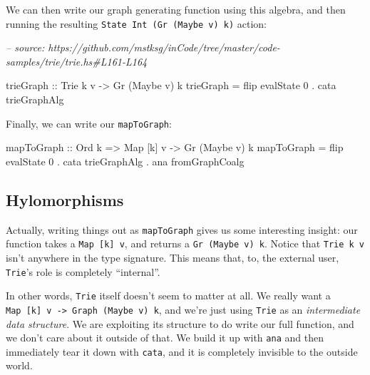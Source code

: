 \documentclass[]{article}
\newenvironment{Shaded}{}{}
\newcommand{\CommentTok}[1]{\textcolor[rgb]{0.38,0.63,0.69}{\textit{#1}}}
\newcommand{\DataTypeTok}[1]{\textcolor[rgb]{0.56,0.13,0.00}{#1}}
\newcommand{\DecValTok}[1]{\textcolor[rgb]{0.25,0.63,0.44}{#1}}
\newcommand{\FunctionTok}[1]{\textcolor[rgb]{0.02,0.16,0.49}{#1}}
\newcommand{\NormalTok}[1]{#1}
\newcommand{\OtherTok}[1]{\textcolor[rgb]{0.00,0.44,0.13}{#1}}
\begin{document}
We can then write our graph generating function using this algebra, and then
running the resulting \texttt{State\ Int\ (Gr\ (Maybe\ v)\ k)} action:

\begin{Shaded}
\begin{Highlighting}[]
\CommentTok{-- source: https://github.com/mstksg/inCode/tree/master/code-samples/trie/trie.hs#L161-L164}

\NormalTok{trieGraph}
\OtherTok{    ::} \DataTypeTok{Trie}\NormalTok{ k v}
    \OtherTok{->} \DataTypeTok{Gr}\NormalTok{ (}\DataTypeTok{Maybe}\NormalTok{ v) k}
\NormalTok{trieGraph }\FunctionTok{=}\NormalTok{ flip evalState }\DecValTok{0} \FunctionTok{.}\NormalTok{ cata trieGraphAlg}
\end{Highlighting}
\end{Shaded}

Finally, we can write our \texttt{mapToGraph}:

\begin{Shaded}
\begin{Highlighting}[]
\NormalTok{mapToGraph}
\OtherTok{    ::} \DataTypeTok{Ord}\NormalTok{ k}
    \OtherTok{=>} \DataTypeTok{Map}\NormalTok{ [k] v}
    \OtherTok{->} \DataTypeTok{Gr}\NormalTok{ (}\DataTypeTok{Maybe}\NormalTok{ v) k}
\NormalTok{mapToGraph }\FunctionTok{=}\NormalTok{ flip evalState }\DecValTok{0}
           \FunctionTok{.}\NormalTok{ cata trieGraphAlg}
           \FunctionTok{.}\NormalTok{ ana fromGraphCoalg}
\end{Highlighting}
\end{Shaded}

\hypertarget{hylomorphisms}{%
\subsection{Hylomorphisms}\label{hylomorphisms}}

Actually, writing things out as \texttt{mapToGraph} gives us some interesting
insight: our function takes a \texttt{Map\ {[}k{]}\ v}, and returns a
\texttt{Gr\ (Maybe\ v)\ k}. Notice that \texttt{Trie\ k\ v} isn't anywhere in
the type signature. This means that, to, the external user, \texttt{Trie}'s role
is completely ``internal''.

In other words, \texttt{Trie} itself doesn't seem to matter at all. We really
want a \texttt{Map\ {[}k{]}\ v\ -\textgreater{}\ Graph\ (Maybe\ v)\ k}, and
we're just using \texttt{Trie} as an \emph{intermediate data structure}. We are
exploiting its structure to do write our full function, and we don't care about
it outside of that. We build it up with \texttt{ana} and then immediately tear
it down with \texttt{cata}, and it is completely invisible to the outside world.
\end{document}
